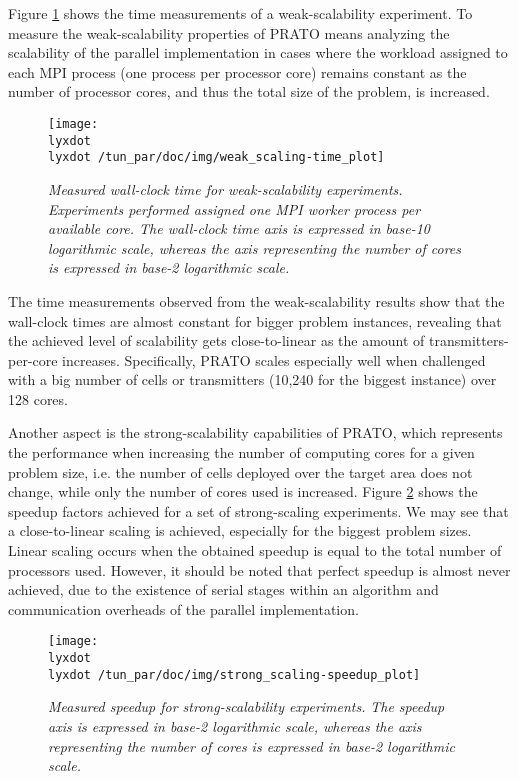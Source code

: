 Figure \ref{fig:weak_scalability_time-1} shows the time measurements
of a weak-scalability experiment. To measure the weak-scalability
properties of PRATO means analyzing the scalability of the parallel
implementation in cases where the workload assigned to each MPI process
(one process per processor core) remains constant as the number of
processor cores, and thus the total size of the problem, is increased.

\begin{figure}
\centering

\texttt{[image: \\lyxdot \\lyxdot /tun\_par/doc/img/weak\_scaling-time\_plot]}

\caption{\textit{\emph{Measured wall-clock time for weak-scalability experiments.}}\textit{
}\textit{\emph{Experiments performed assigned one MPI worker process
per available core. The wall-clock time axis is expressed in base-10
logarithmic scale, whereas the axis representing the number of cores
is expressed in base-2 logarithmic scale.\label{fig:weak_scalability_time-1}}}}
\end{figure}


The time measurements observed from the weak-scalability results show
that the wall-clock times are almost constant for bigger problem instances,
revealing that the achieved level of scalability gets close-to-linear
as the amount of transmitters-per-core increases. Specifically, PRATO
scales especially well when challenged with a big number of cells
or transmitters (10,240 for the biggest instance) over 128 cores.

Another aspect is the strong-scalability capabilities of PRATO, which
represents the performance when increasing the number of computing
cores for a given problem size, i.e. the number of cells deployed
over the target area does not change, while only the number of cores
used is increased. Figure \ref{fig:strong_scalability_speedup-1}
shows the speedup factors achieved for a set of strong-scaling experiments.
We may see that a close-to-linear scaling is achieved, especially
for the biggest problem sizes. Linear scaling occurs when the obtained
speedup is equal to the total number of processors used. However,
it should be noted that perfect speedup is almost never achieved,
due to the existence of serial stages within an algorithm and communication
overheads of the parallel implementation. 

\begin{figure}
\centering

\texttt{[image: \\lyxdot \\lyxdot /tun\_par/doc/img/strong\_scaling-speedup\_plot]}

\caption{\textit{\emph{Measured speedup for strong-scalability experiments.}}\textit{
}\textit{\emph{The speedup axis is expressed in base-2 logarithmic
scale, whereas the axis representing the number of cores is expressed
in base-2 logarithmic scale.\label{fig:strong_scalability_speedup-1}}}}
\end{figure}


